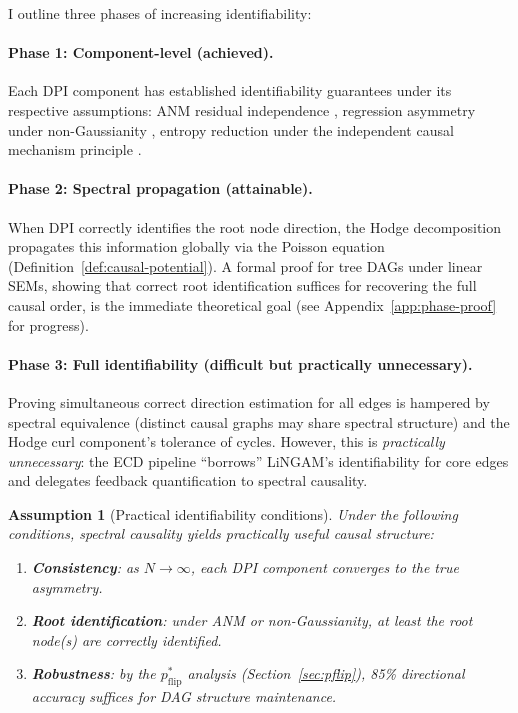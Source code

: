 \documentclass[twoside,11pt]{article}
\newtheorem{assumption}[theorem]{Assumption}
\begin{document}
I outline three phases of increasing identifiability:

\paragraph{Phase 1: Component-level (achieved).}
Each DPI component has established identifiability guarantees under its
respective assumptions: ANM residual independence
\citep{Hoyer2009,Peters2014}, regression asymmetry under non-Gaussianity
\citep{Shimizu2006}, entropy reduction under the independent causal
mechanism principle \citep{Janzing2010}.

\paragraph{Phase 2: Spectral propagation (attainable).}
When DPI correctly identifies the root node direction, the Hodge
decomposition propagates this information globally via the Poisson
equation (Definition~\ref{def:causal-potential}).  A formal proof for
tree DAGs under linear SEMs, showing that correct root identification
suffices for recovering the full causal order, is the immediate
theoretical goal (see Appendix~\ref{app:phase-proof} for progress).

\paragraph{Phase 3: Full identifiability (difficult but practically
unnecessary).}
Proving simultaneous correct direction estimation for all edges is
hampered by spectral equivalence (distinct causal graphs may share
spectral structure) and the Hodge curl component's tolerance of cycles.
However, this is \emph{practically unnecessary}: the ECD pipeline
``borrows'' LiNGAM's identifiability for core edges and delegates
feedback quantification to spectral causality.

\begin{assumption}[Practical identifiability conditions]
\label{asm:practical}
Under the following conditions, spectral causality yields practically
useful causal structure:
\begin{enumerate}
\item[\emph{(i)}] \textbf{Consistency}: as $N\to\infty$, each DPI
  component converges to the true asymmetry.
\item[\emph{(ii)}] \textbf{Root identification}: under ANM or
  non-Gaussianity, at least the root node(s) are correctly identified.
\item[\emph{(iii)}] \textbf{Robustness}: by the $p_{\mathrm{flip}}^*$
  analysis (Section~\ref{sec:pflip}), 85\% directional accuracy suffices
  for DAG structure maintenance.
\end{enumerate}
\end{assumption}
\end{document}
